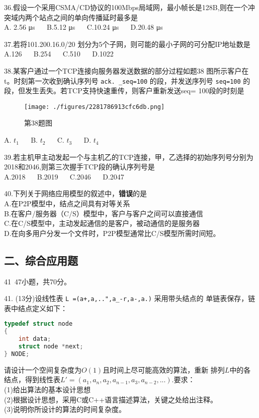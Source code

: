 36.假设一个采用CSMA/CD协议的100Mbps局域网，最小帧长是128B,则在一个冲突域内两个站点之间的单向传播延时最多是 \\
A. 2.56 μs $\quad$ B.5.12 μs $\quad$ C.10.24 μs
$\quad$ D.20.48 μs

37.若将101.200.16.0/20 划分为5个子网，则可能的最小子网的可分配IP地址数是 \\
A.126 $\quad$ B.254 $\quad$ C.510 $\quad$ D.1022

38.某客户通过一个TCP连接向服务器发送数据的部分过程如题38
图所示客户在t。时刻第一次收到确认序列号 \verb|ack. _seq=100| 的段，并发送序列号 \verb|seq=100| 的段，但发生丢失。若TCP支持快速重传，则客户重新发送seq= 100段的时刻是 \\
\begin{figure}[ht]
\centering
\texttt{[image: ./figures/2281786913cfc6db.png]}
\caption{第38题图} \label{fig_CSN19_2}
\end{figure}
A. $t_1$ $\quad$ B. $t_2$ $\quad$ C. $t_3$ $\quad$ D. $t_4$

39.若主机甲主动发起一个与主机乙的TCP连接，甲，乙选择的初始序列号分别为2018和2046,则第三次握手TCP段的确认序列号是 \\
A.2018 $\quad$ B.2019 $\quad$ C.2046 $\quad$ D.2047

40.下列关于网络应用模型的叙述中，\textbf{错误}的是 \\
A.在P2P模型中，结点之间具有对等关系 \\
B.在客户/服务器（C/S）模型中，客户与客户之间可以直接通信 \\
C.在C/S模型中，主动发起通信的是客户，被动通信的是服务器 \\
D.在向多用户分发一个文件时，P2P模型通常比C/S模型所需时间短。

\subsection{二、综合应用题}
41~47小题，共70分。

41. (13分)设线性表 \verb|L =(a+,a,..",a_-r,a-,a.)| 采用带头结点的
单链表保存，链表中结点定义如下：
\begin{lstlisting}[language=cpp]
typedef struct node
{
    int data;
    struct node *next;
} NODE;
\end{lstlisting}
请设计一个空间复杂度为$O(1)$且时间上尽可能高效的算法，重新
排列$L$中的各结点，得到线性表$L'=(a_1,a_n,a_2,a_{n-1},a_3,a_{n-2},...)$.要求： \\
(1)给出算法的基本设计思想 \\
(2)根据设计思想，采用C或C++语言描述算法，关键之处给出注释。 \\
(3)说明你所设计的算法的时间复杂度。

